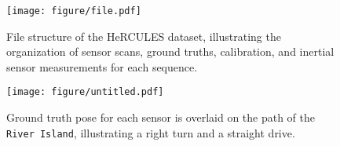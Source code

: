 \begin{figure}[!t]
    \centering
    \texttt{[image: figure/file.pdf]}
    \caption{File structure of the HeRCULES dataset, illustrating the organization of sensor scans, ground truths, calibration, and inertial sensor measurements for each sequence.}
    \label{fig:file}
    \vspace{-4mm}
\end{figure}



\begin{figure}[!t]
    \centering
    \texttt{[image: figure/untitled.pdf]}
    \caption{Ground truth pose for each sensor is overlaid on the path of the \texttt{River Island}, illustrating a right turn and a straight drive.}
    \label{fig:gtpose}
    \vspace{-5.8mm}
\end{figure}



